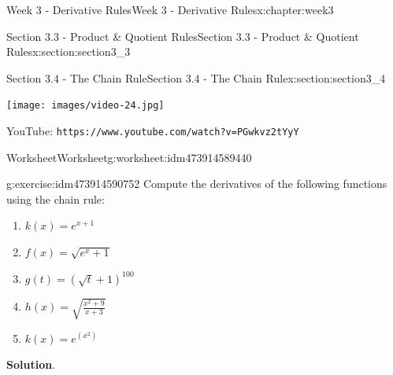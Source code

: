 \documentclass[oneside,10pt,]{book}
\newcommand{\blocktitlefont}{\relax}
\newcommand{\mono}[1]{\texttt{#1}}
\numberwithin{equation}{section}
\newlength{\qrsize}
\newlength{\previewwidth}
\begin{document}
\begin{chapterptx}{Week 3 - Derivative Rules}{}{Week 3 - Derivative Rules}{}{}{x:chapter:week3}
\begin{sectionptx}{Section 3.3 - Product \& Quotient Rules}{}{Section 3.3 - Product \& Quotient Rules}{}{}{x:section:section3_3}
\begin{tcbraster}[raster columns=2, raster column skip=1pt, raster halign=center, raster force size=false, raster left skip=0pt, raster right skip=0pt]
\end{tcbraster}%
\end{sectionptx}
%
%
\typeout{************************************************}
\typeout{************************************************}
%
\begin{sectionptx}{Section 3.4 - The Chain Rule}{}{Section 3.4 - The Chain Rule}{}{}{x:section:section3_4}
\setlength{\qrsize}{9em}
\setlength{\previewwidth}{\linewidth}
\addtolength{\previewwidth}{-\qrsize}
\begin{tcbraster}[raster columns=2, raster column skip=1pt, raster halign=center, raster force size=false, raster left skip=0pt, raster right skip=0pt]%
\begin{tcolorbox}[previewstyle, width=\previewwidth]%
\texttt{[image: images/video-24.jpg]}%
\end{tcolorbox}%
\begin{tcolorbox}[qrstyle]%
{\hypersetup{urlcolor=black}}%
\end{tcolorbox}%
\begin{tcolorbox}[captionstyle]%
\small YouTube: \mono{https://www.youtube.com/watch?v=PGwkvz2tYyY}\end{tcolorbox}%
\end{tcbraster}%
%
%
\typeout{************************************************}
\typeout{************************************************}
%
\begin{worksheet-subsection}{Worksheet}{}{Worksheet}{}{}{g:worksheet:idm473914589440}
\begin{divisionexercise}{1}{}{}{g:exercise:idm473914590752}%
Compute the derivatives of the following functions using the chain rule:%
%
\begin{enumerate}[label=(\alph*)]
\item{}\(\displaystyle k(x) = e^{x+1}\)%
\item{}\(\displaystyle f(x) = \sqrt{e^x +1}\)%
\item{}\(\displaystyle g(t) = (\sqrt{t} + 1)^{100}\)%
\item{}\(\displaystyle h(x) = \sqrt{ \frac{x^2+9}{x+3}}\)%
\item{}\(\displaystyle k(x) = e^{(x^2)}\)%
\end{enumerate}
\textbf{\blocktitlefont Solution}.\hypertarget{g:solution:idm473914591440}{}\quad{}%
\begin{enumerate}[label=(\alph*)]

\end{enumerate}
\end{divisionexercise}
\end{worksheet-subsection}
\end{sectionptx}
\end{chapterptx}
\end{document}

